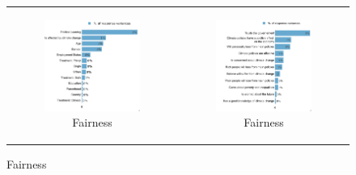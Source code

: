 \documentclass{article}
\begin{document}
\begin{figure}[h!]
\begin{center}
	\caption{Fairness and Pricing vs. Norms}
	\caption*{Variance decomposition LMG}
	\setlength\extrarowheight{-1pt}
	\begin{tabular}{cc}
		\begin{subfigure}{0.5\textwidth}
		\caption{Fairness}
			\includegraphics[width=\textwidth]{lmg_fairness_socio_non_standardized}
		\end{subfigure}&
		\begin{subfigure}{0.5\textwidth}
		\caption{Fairness}
			\includegraphics[width=\textwidth]{lmg_fairness_indices_non_standardized}
		\end{subfigure}\\
	\end{tabular}


\end{center}
\end{figure}
\end{document}
